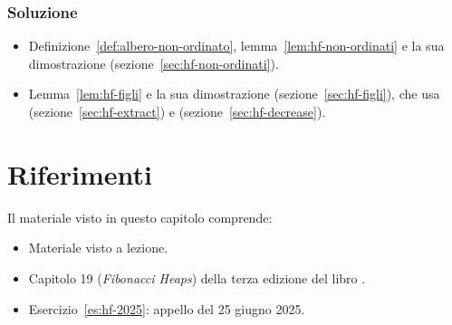 \subsubsection*{Soluzione}
\begin{itemize}
    \item[(a)] Definizione~\ref{def:albero-non-ordinato}, lemma~\ref{lem:hf-non-ordinati} e la sua dimostrazione (sezione~\ref{sec:hf-non-ordinati}).
    \item[(b)] Lemma~\ref{lem:hf-figli} e la sua dimostrazione (sezione~\ref{sec:hf-figli}), che usa \Consolidate{} (sezione~\ref{sec:hf-extract}) e \CascadingCut{} (sezione~\ref{sec:hf-decrease}).
\end{itemize}

\section*{Riferimenti}
Il materiale visto in questo capitolo comprende:
\begin{itemize}
    \item Materiale visto a lezione.
    \item Capitolo 19 (\emph{Fibonacci Heaps}) della terza edizione del libro  \cite{Cormen-et-al-2009}.
    \item Esercizio~\ref{es:hf-2025}: appello del 25 giugno 2025.
\end{itemize}

